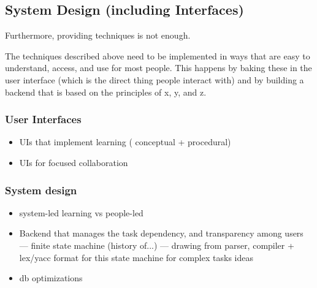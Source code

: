 \subsection{System Design (including Interfaces)}


Furthermore, providing techniques is not enough. 

The techniques described above need to be implemented in ways that are easy to understand, access, and use for most people. This happens by baking these in the user interface (which is the direct thing people interact with) and by building a backend that is based on the principles of x, y, and z.

\subsubsection{User Interfaces}
\begin{itemize}
\item UIs that implement learning ( conceptual + procedural)
\item UIs for focused collaboration  
\end{itemize}

\subsubsection{System design}

\begin{itemize}
\item system-led learning vs people-led
\item Backend that manages the task dependency, and transparency among users
--- finite state machine (history of...)
--- drawing from parser, compiler + lex/yacc format for this state machine for complex tasks ideas
\item  db optimizations
\end{itemize}

